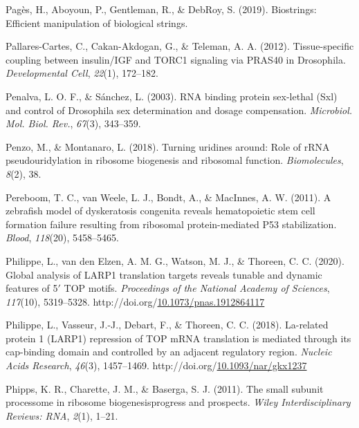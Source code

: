 \documentclass[12pt,oneside]{reedthesis}
\newlength{\cslhangindent}
\newenvironment{CSLReferences}[2] %
 {%
  \setlength{\parindent}{0pt}
  \ifodd #1 \everypar{\setlength{\hangindent}{\cslhangindent}}\ignorespaces\fi
  \ifnum #2 > 0
  \setlength{\parskip}{#2\baselineskip}
  \fi
 }%
 {}
\begin{document}
\begin{CSLReferences}{1}{0}
\leavevmode{}%
Pagès, H., Aboyoun, P., Gentleman, R., \& DebRoy, S. (2019). Biostrings: {Efficient} manipulation of biological strings.

\leavevmode{}%
Pallares-Cartes, C., Cakan-Akdogan, G., \& Teleman, A. A. (2012). Tissue-specific coupling between insulin/{IGF} and {TORC1} signaling via {PRAS40} in {Drosophila}. \emph{Developmental Cell}, \emph{22}(1), 172--182.

\leavevmode{}%
Penalva, L. O. F., \& Sánchez, L. (2003). {RNA} binding protein sex-lethal ({Sxl}) and control of {Drosophila} sex determination and dosage compensation. \emph{Microbiol. Mol. Biol. Rev.}, \emph{67}(3), 343--359.

\leavevmode{}%
Penzo, M., \& Montanaro, L. (2018). Turning uridines around: {Role} of {rRNA} pseudouridylation in ribosome biogenesis and ribosomal function. \emph{Biomolecules}, \emph{8}(2), 38.

\leavevmode{}%
Pereboom, T. C., van Weele, L. J., Bondt, A., \& MacInnes, A. W. (2011). A zebrafish model of dyskeratosis congenita reveals hematopoietic stem cell formation failure resulting from ribosomal protein-mediated P53 stabilization. \emph{Blood}, \emph{118}(20), 5458--5465.

\leavevmode{}%
Philippe, L., van den Elzen, A. M. G., Watson, M. J., \& Thoreen, C. C. (2020). Global analysis of {LARP1} translation targets reveals tunable and dynamic features of 5{\({'}\)} {TOP} motifs. \emph{Proceedings of the National Academy of Sciences}, \emph{117}(10), 5319--5328. http://doi.org/\href{https://doi.org/10.1073/pnas.1912864117}{10.1073/pnas.1912864117}

\leavevmode{}%
Philippe, L., Vasseur, J.-J., Debart, F., \& Thoreen, C. C. (2018). La-related protein 1 ({LARP1}) repression of {TOP mRNA} translation is mediated through its cap-binding domain and controlled by an adjacent regulatory region. \emph{Nucleic Acids Research}, \emph{46}(3), 1457--1469. http://doi.org/\href{https://doi.org/10.1093/nar/gkx1237}{10.1093/nar/gkx1237}

\leavevmode{}%
Phipps, K. R., Charette, J. M., \& Baserga, S. J. (2011). The small subunit processome in ribosome biogenesis\textemdash progress and prospects. \emph{Wiley Interdisciplinary Reviews: RNA}, \emph{2}(1), 1--21.


\end{CSLReferences}
\end{document}
